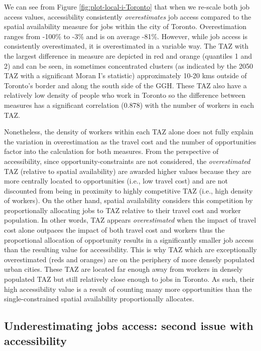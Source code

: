 \documentclass[]{elsarticle} %
\begin{document}
We can see from Figure \ref{fig:plot-local-i-Toronto} that when we
re-scale both job access values, accessibility consistently
\emph{overestimates} job access compared to the spatial availability
measure for jobs within the city of Toronto. Overestimation ranges from
-100\% to -3\% and is on average -81\%. However, while job access is
consistently overestimated, it is overestimated in a variable way. The
TAZ with the largest difference in measure are depicted in red and
orange (quantiles 1 and 2) and can be seen, in sometimes concentrated
clusters (as indicated by the 2050 TAZ with a significant Moran I's
statistic) approximately 10-20 kms outside of Toronto's border and along
the south side of the GGH. These TAZ also have a relatively low density
of people who work in Toronto so the difference between measures has a
significant correlation (0.878) with the number of workers in each TAZ.

Nonetheless, the density of workers within each TAZ alone does not fully
explain the variation in overestimation as the travel cost and the
number of opportunities factor into the calculation for both measures.
From the perspective of accessibility, since opportunity-constraints are
not considered, the \emph{overestimated} TAZ (relative to spatial
availability) are awarded higher values because they are more centrally
located to opportunities (i.e., low travel cost) and are not discounted
from being in proximity to highly competitive TAZ (i.e., high density of
workers). On the other hand, spatial availability considers this
competition by proportionally allocating jobs to TAZ relative to their
travel cost and worker population. In other words, TAZ appears
\emph{overestimated} when the impact of travel cost alone outpaces the
impact of both travel cost and workers thus the proportional allocation
of opportunity results in a significantly smaller job access than the
resulting value for accessibility. This is why TAZ which are
exceptionally overestimated (reds and oranges) are on the periphery of
more densely populated urban cities. These TAZ are located far enough
away from workers in densely populated TAZ but still relatively close
enough to jobs in Toronto. As such, their high accessibility value is a
result of counting many more opportunities than the single-constrained
spatial availability proportionally allocates.

\hypertarget{underestimating-jobs-access-second-issue-with-accessibility}{%
\subsection{Underestimating jobs access: second issue with
accessibility}\label{underestimating-jobs-access-second-issue-with-accessibility}}
\end{document}
